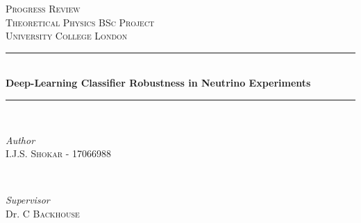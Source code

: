 \documentclass[11pt]{article}
\begin{document}

\begin{titlepage} %
	\newcommand{\HRule}{\rule{\linewidth}{0.5mm}} %
	
	\center %
	
	
	
	
	\textsc{\LARGE Progress Review}\\[1.5cm] %
	
	\textsc{\Large Theoretical Physics BSc Project}\\[0.5cm] %
	
	\textsc{\large University College London}\\[0.5cm] %
	
	
	\HRule\\[0.4cm]
	
	{\huge\bfseries Deep-Learning Classifier Robustness in Neutrino Experiments}\\[0.2cm] %
	
	\HRule\\[1.5cm]
	
	
	\begin{minipage}{0.4\textwidth}
		\begin{flushleft}
			\large
			\textit{Author}\\
			I.J.S. \textsc{Shokar - 17066988} %
		\end{flushleft}
	\end{minipage}
	~
	\begin{minipage}{0.4\textwidth}
		\begin{flushright}
			\large
			\textit{Supervisor}\\
			Dr. C \textsc{Backhouse} %
		\end{flushright}
	\end{minipage}
	

\end{titlepage}
\end{document}
